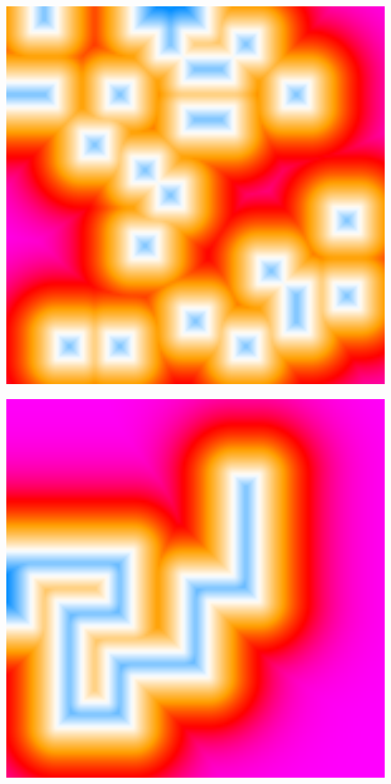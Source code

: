 \begin{center}
\begin{minipage}{.07\textwidth}
        \small{\ }
    \end{minipage}%
    \begin{minipage}{.31\textwidth}
        \centering
        \includegraphics[width=0.95\textwidth]{img/obstacle sdf.png}
        \small{}
    \end{minipage}%
    \begin{minipage}{.31\textwidth}
        \centering
        \includegraphics[width=0.95\textwidth]{img/path sdf.png}

\end{minipage}
\end{center}
